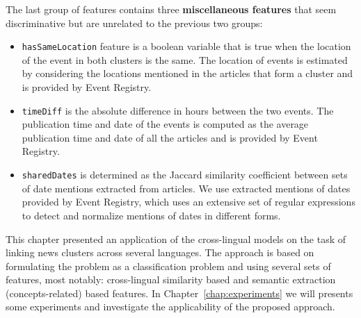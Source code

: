 The last group of features contains three {\bf miscellaneous features} that seem
discriminative but are unrelated to the previous two groups:
\begin{itemize}
\item \texttt{hasSameLocation} feature is a boolean variable that is true when the location of the event
in both clusters is the same. The location of events is estimated by considering the locations mentioned
in the articles that form a cluster and is provided by Event Registry.
\item \texttt{timeDiff} is the absolute difference in hours between the two events. The publication time
and date of the events is computed as the average publication time and date of all the articles and is
provided by Event Registry.
\item \texttt{sharedDates} is determined as the Jaccard similarity coefficient between sets of date
mentions extracted from articles. We use extracted mentions of dates provided by Event Registry, which
uses an extensive set of regular expressions to detect and normalize mentions of dates in different forms.
\end{itemize}

This chapter presented an application of the cross-lingual models on the task of linking news clusters across several
languages. The approach is based on formulating the problem as a classification problem and using several sets of
features, most notably: cross-lingual similarity based and semantic extraction (concepts-related) based features.
In Chapter~\ref{chap:experiments} we will presents some experiments and investigate the applicability of the proposed approach.